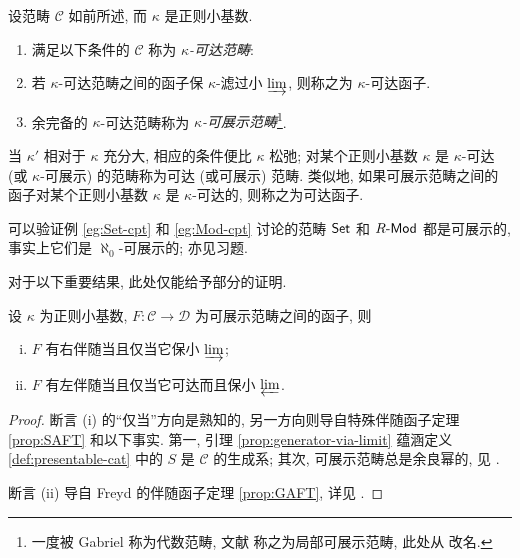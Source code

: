 \begin{definition}\label{def:presentable-cat}
	设范畴 $\mathcal{C}$ 如前所述, 而 $\kappa$ 是正则小基数.
	\begin{enumerate}
		\item 满足以下条件的 $\mathcal{C}$ 称为 \emph{$\kappa$-可达范畴}:
		\item 若 $\kappa$-可达范畴之间的函子保 $\kappa$-滤过小 $\varinjlim$, 则称之为 $\kappa$-可达函子.
		\item 余完备的 $\kappa$-可达范畴称为 \emph{$\kappa$-可展示范畴}\footnote{一度被 Gabriel 称为代数范畴, 文献 \cite{AR94, GU71} 称之为局部可展示范畴, 此处从 \cite[A.1.1]{Lu09} 改名.}.
	\end{enumerate}

	当 $\kappa'$ 相对于 $\kappa$ 充分大, 相应的条件便比 $\kappa$ 松弛; 对某个正则小基数 $\kappa$ 是 $\kappa$-可达 (或 $\kappa$-可展示) 的范畴称为可达 (或可展示) 范畴. 类似地, 如果可展示范畴之间的函子对某个正则小基数 $\kappa$ 是 $\kappa$-可达的, 则称之为可达函子.
\end{definition}

可以验证例 \ref{eg:Set-cpt} 和 \ref{eg:Mod-cpt} 讨论的范畴 $\mathsf{Set}$ 和 $R\text{-}\mathsf{Mod}$ 都是可展示的, 事实上它们是 $\aleph_0$-可展示的; 亦见习题.

对于以下重要结果, 此处仅能给予部分的证明.

\begin{theorem}
	设 $\kappa$ 为正则小基数, $F: \mathcal{C} \to \mathcal{D}$ 为可展示范畴之间的函子, 则
	\begin{enumerate}[(i)]
		\item $F$ 有右伴随当且仅当它保小 $\varinjlim$;
		\item $F$ 有左伴随当且仅当它可达而且保小 $\varprojlim$.
	\end{enumerate}
\end{theorem}
\begin{proof}
	断言 (i) 的``仅当''方向是熟知的, 另一方向则导自特殊伴随函子定理 \ref{prop:SAFT} 和以下事实. 第一, 引理 \ref{prop:generator-via-limit} 蕴涵定义 \ref{def:presentable-cat} 中的 $S$ 是 $\mathcal{C}$ 的生成系; 其次, 可展示范畴总是余良幂的, 见 \cite[1.58 Theorem]{AR94}.
	
	断言 (ii) 导自 Freyd 的伴随函子定理 \ref{prop:GAFT}, 详见 \cite[1.66 Theorem]{AR94}.
\end{proof}

